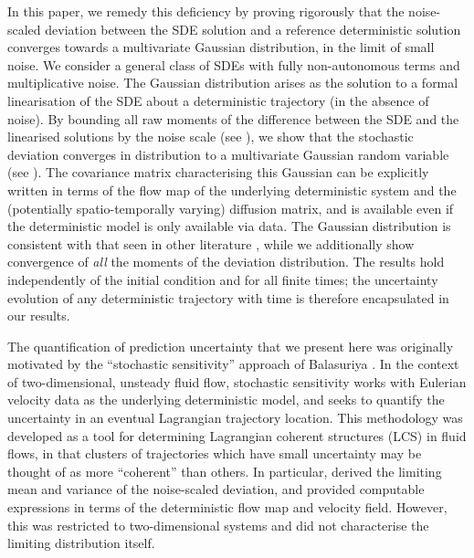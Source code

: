 In this paper, we remedy this deficiency by proving rigorously that the noise-scaled deviation between the SDE solution and a reference deterministic solution converges towards a multivariate Gaussian distribution, in the limit of small noise.
We consider a general class of SDEs with fully non-autonomous terms and multiplicative noise.
The Gaussian distribution arises as the solution to a formal linearisation of the SDE about a deterministic trajectory (in the absence of noise).
By bounding all raw moments of the difference between the SDE and the linearised solutions by the noise scale (see ), we show that the stochastic deviation converges in distribution to a multivariate Gaussian random variable (see ). 
The covariance matrix characterising this Gaussian can be explicitly written in terms of the flow map of the underlying deterministic system and the (potentially spatio-temporally varying) diffusion matrix, and is available even if the deterministic model is only available via data.
The Gaussian distribution is consistent with that seen in other literature \cite{Jazwinski_2014_StochasticProcessesFiltering, Sanz-AlonsoStuart_2017_GaussianApproximationsSmall, SarkkaSolin_2019_AppliedStochasticDifferential}, while we additionally show convergence of \emph{all} the moments of the deviation distribution.
The results hold independently of the initial condition and for all finite times; the uncertainty evolution of any deterministic trajectory with time is therefore encapsulated in our results.

The quantification of prediction uncertainty that we present here was originally motivated by the ``stochastic sensitivity'' approach of Balasuriya \cite{Balasuriya_2020_StochasticSensitivityComputable}.
In the context of two-dimensional, unsteady fluid flow, stochastic sensitivity works with Eulerian velocity data as the underlying deterministic model, and seeks to quantify the uncertainty in an eventual Lagrangian trajectory location.
This methodology was developed as a tool for determining Lagrangian coherent structures (LCS) \cite{BalasuriyaEtAl_2018_GeneralizedLagrangianCoherent,HadjighasemEtAl_2017_CriticalComparisonLagrangian} in fluid flows, in that clusters of trajectories which have small uncertainty may be thought of as more ``coherent'' than others.  
In particular, \cite{Balasuriya_2020_StochasticSensitivityComputable} derived the limiting mean and variance of the noise-scaled deviation, and provided computable expressions in terms of the deterministic flow map and velocity field.
However, this was restricted to two-dimensional systems and did not characterise the limiting distribution itself.

